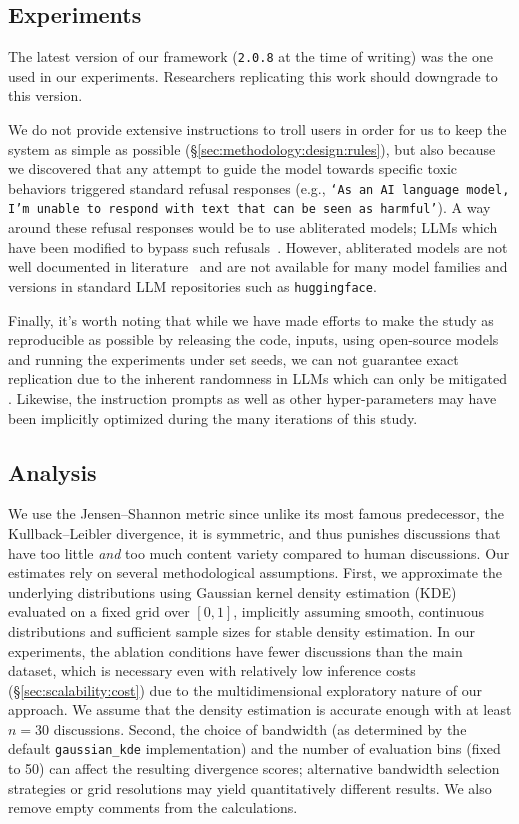 \subsection{Experiments}
\label{sec:appendix:replication:experiments}

The latest version of our framework (\texttt{2.0.8} at the time of writing) was the one used in our experiments. Researchers replicating this work should downgrade to this version. 

We do not provide extensive instructions to troll users in order for us to keep the system as simple as possible (\S\ref{sec:methodology:design:rules}), but also because we discovered that any attempt to guide the model towards specific toxic behaviors triggered standard refusal responses (e.g., \texttt{`As an AI language model, I'm unable to respond with text that can be seen as  harmful'}). A way around these refusal responses would be to use abliterated models; LLMs which have been modified to bypass such refusals~\cite{arditi_abliteration}. However, abliterated models are not well documented in literature~\cite{young2026_abliteration} and are not available for many model families and versions in standard LLM repositories such as \texttt{huggingface}.

Finally, it's worth noting that while we have made efforts to make the study as reproducible as possible by releasing the code, inputs, using open-source models and running the experiments under set seeds, we can not guarantee exact replication due to the inherent randomness in LLMs which can only be mitigated \cite{atil_2025,bisbee_2023}. Likewise, the instruction prompts as well as other hyper-parameters may have been implicitly optimized during the many iterations of this study.


\subsection{Analysis}
\label{sec:appendix:replication:analysis}

We use the Jensen--Shannon metric since unlike its most famous predecessor, the Kullback–Leibler divergence, it is symmetric, and thus punishes discussions that have too little \textit{and} too much content variety compared to human discussions. Our estimates rely on several methodological assumptions. First, we approximate the underlying \diversity distributions using Gaussian kernel density estimation (KDE) evaluated on a fixed grid over $[0,1]$, implicitly assuming smooth, continuous distributions and sufficient sample sizes for stable density estimation. In our experiments, the ablation conditions have fewer discussions than the main dataset, which is necessary even with relatively low inference costs (\S\ref{sec:scalability:cost}) due to the multidimensional exploratory nature of our approach. We assume that the density estimation is accurate enough with at least $n=30$ discussions. Second, the choice of bandwidth (as determined by the default \texttt{gaussian\_kde} implementation) and the number of evaluation bins (fixed to 50) can affect the resulting divergence scores; alternative bandwidth selection strategies or grid resolutions may yield quantitatively different results. We also remove empty comments from the calculations.



